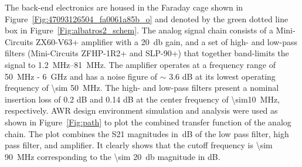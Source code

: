 The back-end electronics are housed in the Faraday cage shown in Figure~\ref{Fig:47093126504_fa0061a85b_o} and denoted by the green dotted line box in Figure~\ref{Fig:albatros2_schem}. The analog signal chain consists of a Mini-Circuits ZX60-V63+ amplifier with a \SI{20}{\decibel} gain, and a set of high- and low-pass filters (Mini-Circuits ZFHP-1R2+ and SLP-90+) that together band-limits the signal to \SIrange{1.2}{81}{\mega\hertz}. The amplifier operates at a frequency range of \SI{50}{\mega\hertz} - \SI{6}{\giga\hertz} and has a noise figure of $\sim$ 3.6 dB at its lowest operating frequency of \SI{\sim 50}{MHz}. The high- and low-pass filters present a nominal insertion loss of 0.2 dB and 0.14 dB at the center frequency of \SI{\sim10}{MHz}, respectively. AWR design environment simulation and analysis were used as shown in Figure~\ref{Fig:path} to plot the combined transfer function of the analog chain. The plot combines the S21 magnitudes in~dB of the low pass filter, high pass filter, and amplifier. It clearly shows that the cutoff frequency is \SI{\sim 90}{MHz} corresponding to the \SI{\sim 20}{\decibel} magnitude in dB.

